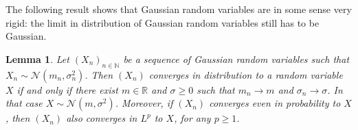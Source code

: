 \documentclass{article}
\newtheorem{lemma}{Lemma}
\newcommand{\1}{\mathbbm{1}}
\begin{document}
The following result shows that Gaussian random variables are in some sense
very rigid: the limit in distribution of Gaussian random variables still has
to be Gaussian.

\begin{lemma}
  \label{lem:limit.gaussians}Let $(X_n)_{n \in \mathbb{N}}$ be a sequence of
  Gaussian random variables such that $X_n \sim \mathcal{N} (m_n,
  \sigma_n^2)$. Then $(X_n)$ converges in distribution to a random variable
  $X$ if and only if there exist $m \in \mathbb{R}$ and $\sigma \geqslant 0$
  such that $m_n \rightarrow m$ and $\sigma_n \rightarrow \sigma$. In that
  case $X \sim \mathcal{N} (m, \sigma^2)$. Moreover, if $(X_n)$ converges even
  in probability to $X$, then $(X_n)$ also converges in $L^p$ to $X$, for any
  $p \geqslant 1$.
\end{lemma}
\end{document}

